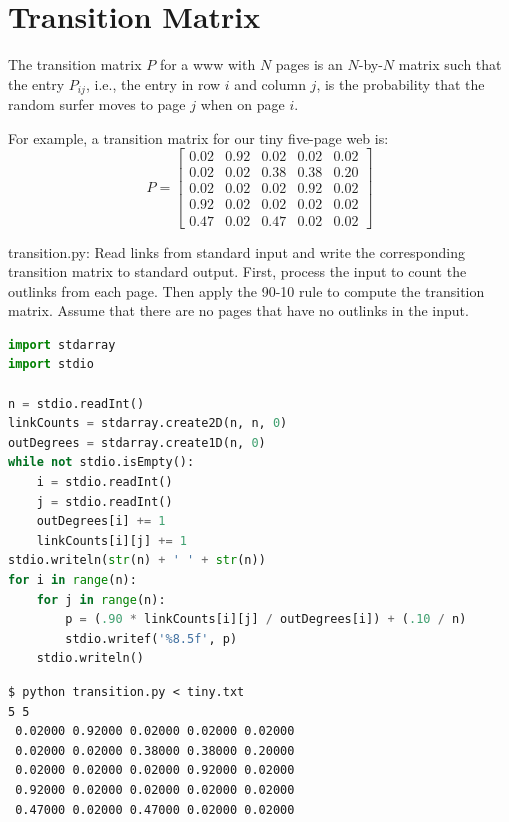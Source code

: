 \documentclass[8pt,a4paper,compress,handout]{beamer}
\begin{document}
\section{Transition Matrix}
\begin{frame}[fragile]
The transition matrix $P$ for a www with $N$ pages is an $N$-by-$N$ matrix such that the entry $P_{ij}$, i.e., the entry in row $i$ and column $j$, is the probability that the random surfer moves to page $j$ when on page $i$.

\bigskip

For example, a transition matrix for our tiny five-page web is:
\[
P = \begin{bmatrix}
0.02 & 0.92 & 0.02 & 0.02 & 0.02 \\
0.02 & 0.02 & 0.38 & 0.38 & 0.20 \\
0.02 & 0.02 & 0.02 & 0.92 & 0.02 \\
0.92 & 0.02 & 0.02 & 0.02 & 0.02 \\
0.47 & 0.02 & 0.47 & 0.02 & 0.02
\end{bmatrix}
\]
\end{frame}
\begin{frame}[fragile]
\begin{framed}
\tiny transition.py: Read links from standard input and write the corresponding transition matrix to standard output. First, process the input to count the outlinks from each page. Then apply the 90-10 rule to compute the transition matrix. Assume that there are no pages that have no outlinks in the input.
\end{framed}

\begin{lstlisting}[language=Python]
import stdarray
import stdio

n = stdio.readInt()
linkCounts = stdarray.create2D(n, n, 0)
outDegrees = stdarray.create1D(n, 0)
while not stdio.isEmpty():
    i = stdio.readInt()
    j = stdio.readInt()
    outDegrees[i] += 1
    linkCounts[i][j] += 1
stdio.writeln(str(n) + ' ' + str(n))
for i in range(n):
    for j in range(n):
        p = (.90 * linkCounts[i][j] / outDegrees[i]) + (.10 / n)
        stdio.writef('%8.5f', p)
    stdio.writeln()
\end{lstlisting}

\begin{lstlisting}[language={}]
$ python transition.py < tiny.txt
5 5
 0.02000 0.92000 0.02000 0.02000 0.02000
 0.02000 0.02000 0.38000 0.38000 0.20000
 0.02000 0.02000 0.02000 0.92000 0.02000
 0.92000 0.02000 0.02000 0.02000 0.02000
 0.47000 0.02000 0.47000 0.02000 0.02000
\end{lstlisting}
\end{frame}
\end{document}
